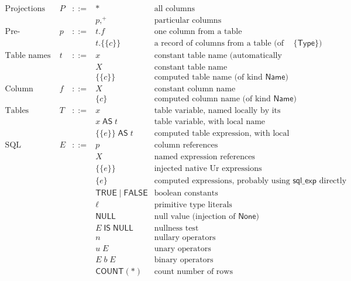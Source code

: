 \documentclass{article}
\newcommand{\mt}[1]{\mathsf{#1}}
\begin{document}
$$\begin{array}{rrcll}
  \textrm{Projections} & P &::=& \ast & \textrm{all columns} \\
  &&& p,^+ & \textrm{particular columns} \\
  \textrm{Pre-projections} & p &::=& t.f & \textrm{one column from a table} \\
  &&& t.\{\{c\}\} & \textrm{a record of columns from a table (of kind $\{\mt{Type}\}$)} \\
  \textrm{Table names} & t &::=& x & \textrm{constant table name (automatically capitalized)} \\
  &&& X & \textrm{constant table name} \\
  &&& \{\{c\}\} & \textrm{computed table name (of kind $\mt{Name}$)} \\
  \textrm{Column names} & f &::=& X & \textrm{constant column name} \\
  &&& \{c\} & \textrm{computed column name (of kind $\mt{Name}$)} \\
  \textrm{Tables} & T &::=& x & \textrm{table variable, named locally by its own capitalization} \\
  &&& x \; \mt{AS} \; t & \textrm{table variable, with local name} \\
  &&& \{\{e\}\} \; \mt{AS} \; t & \textrm{computed table expression, with local name} \\
  \textrm{SQL expressions} & E &::=& p & \textrm{column references} \\
  &&& X & \textrm{named expression references} \\
  &&& \{\{e\}\} & \textrm{injected native Ur expressions} \\
  &&& \{e\} & \textrm{computed expressions, probably using $\mt{sql\_exp}$ directly} \\
  &&& \mt{TRUE} \mid \mt{FALSE} & \textrm{boolean constants} \\
  &&& \ell & \textrm{primitive type literals} \\
  &&& \mt{NULL} & \textrm{null value (injection of $\mt{None}$)} \\
  &&& E \; \mt{IS} \; \mt{NULL} & \textrm{nullness test} \\
  &&& n & \textrm{nullary operators} \\
  &&& u \; E & \textrm{unary operators} \\
  &&& E \; b \; E & \textrm{binary operators} \\
  &&& \mt{COUNT}(\ast) & \textrm{count number of rows} \\

\end{array}$$
\end{document}
